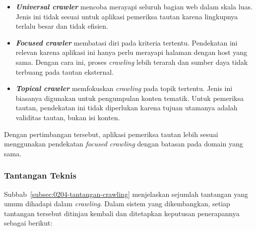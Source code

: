 \begin{itemize}
  \item \textbf{\textit{Universal crawler}} mencoba merayapi seluruh bagian web dalam skala luas. Jenis ini tidak sesuai untuk aplikasi pemeriksa tautan karena lingkupnya terlalu besar dan tidak efisien.
  \item \textbf{\textit{Focused crawler}} membatasi diri pada kriteria tertentu. Pendekatan ini relevan karena aplikasi ini hanya perlu merayapi halaman dengan host yang sama. Dengan cara ini, proses \textit{crawling} lebih terarah dan sumber daya tidak terbuang pada tautan eksternal.
  \item \textbf{\textit{Topical crawler}} memfokuskan \textit{crawling} pada topik tertentu. Jenis ini biasanya digunakan untuk pengumpulan konten tematik. Untuk pemeriksa tautan, pendekatan ini tidak diperlukan karena tujuan utamanya adalah validitas tautan, bukan isi konten.
\end{itemize}

Dengan pertimbangan tersebut, aplikasi pemeriksa tautan lebih sesuai menggunakan pendekatan \textit{focused crawling} dengan batasan pada domain yang sama.

\subsubsection*{Tantangan Teknis}
Subbab~\ref{subsec:0204-tantangan-crawling} menjelaskan sejumlah tantangan yang umum dihadapi dalam \textit{crawling}. Dalam sistem yang dikembangkan, setiap tantangan tersebut ditinjau kembali dan ditetapkan keputusan penerapannya sebagai berikut:

